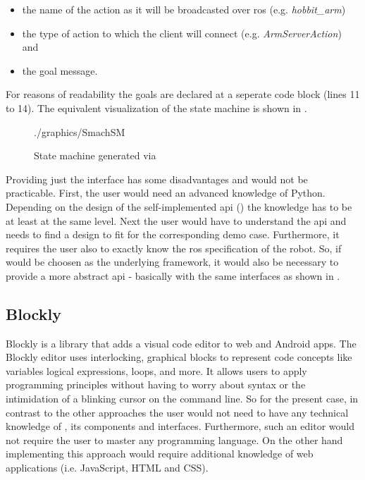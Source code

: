 \begin{itemize}
	\item the name of the action as it will be broadcasted over \gls{ros} (e.g. \textit{hobbit\_arm})
	\item the type of action to which the client will connect (e.g. \textit{ArmServerAction}) and
	\item the goal message.
\end{itemize}

For reasons of readability the goals are declared at a seperate code block (lines 11 to 14). The equivalent visualization of the state machine is shown in . \\

\begin{figure}[htbp]
	
\end{figure}

\begin{figure}[htbp]
	\centering
	\begin{overpic}[width=0.7\linewidth]{./graphics/SmachSM}
	\end{overpic}
	\caption{State machine generated via }%
	\label{fig:SmachSM}%
\end{figure}

Providing just the \smach{} interface has some disadvantages and would not be practicable. First, the user would need an advanced knowledge of Python. Depending on the design of the self-implemented \gls{api} () the knowledge has to be at least at the same level. Next the user would have to understand the \gls{api} and needs to find a design to fit for the corresponding demo case. Furthermore, it requires the user also to exactly know the \gls{ros} specification of the robot. So, if \smach{} would be choosen as the underlying framework, it would also be necessary to provide a more abstract \gls{api} - basically with the same interfaces as shown in .

\subsection{Blockly} \label{sub:Blockly}
Blockly is a library that adds a visual code editor to web and Android apps. The Blockly editor uses interlocking, graphical blocks to represent code concepts like variables logical expressions, loops, and more. It allows users to apply programming principles without having to worry about syntax or the intimidation of a blinking cursor on the command line. \cite{BlocklyIntro} So for the present case, in contrast to the other approaches the user would not need to have any technical knowledge of \hobbit{}, its components and interfaces. Furthermore, such an editor would not require the user to master any programming language. On the other hand implementing this approach would require additional knowledge of web applications (i.e. JavaScript, HTML and CSS). \\

